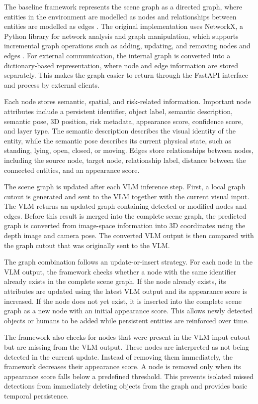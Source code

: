 {\small

The baseline framework represents the scene graph as a directed graph, where entities in the environment are modelled as nodes and relationships between entities are modelled as edges \cite{previous_rsg_thesis}. The original implementation uses NetworkX, a Python library for network analysis and graph manipulation, which supports incremental graph operations such as adding, updating, and removing nodes and edges \cite{hagberg2008networkx}. For external communication, the internal graph is converted into a dictionary-based representation, where node and edge information are stored separately. This makes the graph easier to return through the FastAPI interface and process by external clients.

Each node stores semantic, spatial, and risk-related information. Important node attributes include a persistent identifier, object label, semantic description, semantic pose, 3D position, risk metadata, appearance score, confidence score, and layer type. The semantic description describes the visual identity of the entity, while the semantic pose describes its current physical state, such as standing, lying, open, closed, or moving. Edges store relationships between nodes, including the source node, target node, relationship label, distance between the connected entities, and an appearance score.

The scene graph is updated after each VLM inference step. First, a local graph cutout is generated and sent to the VLM together with the current visual input. The VLM returns an updated graph containing detected or modified nodes and edges. Before this result is merged into the complete scene graph, the predicted graph is converted from image-space information into 3D coordinates using the depth image and camera pose. The converted VLM output is then compared with the graph cutout that was originally sent to the VLM.

The graph combination follows an update-or-insert strategy. For each node in the VLM output, the framework checks whether a node with the same identifier already exists in the complete scene graph. If the node already exists, its attributes are updated using the latest VLM output and its appearance score is increased. If the node does not yet exist, it is inserted into the complete scene graph as a new node with an initial appearance score. This allows newly detected objects or humans to be added while persistent entities are reinforced over time.

The framework also checks for nodes that were present in the VLM input cutout but are missing from the VLM output. These nodes are interpreted as not being detected in the current update. Instead of removing them immediately, the framework decreases their appearance score. A node is removed only when its appearance score falls below a predefined threshold. This prevents isolated missed detections from immediately deleting objects from the graph and provides basic temporal persistence.

}
